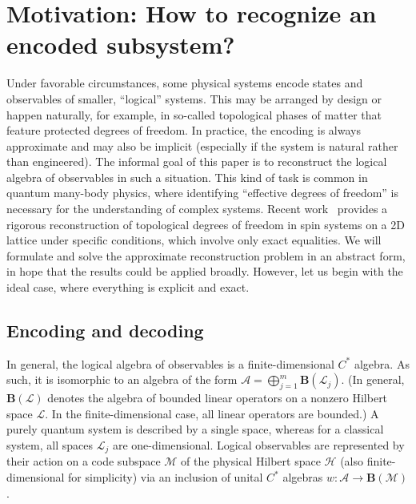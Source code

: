 \documentclass[12pt]{article}
\newcommand{\calA}{\mathcal{A}}
\newcommand{\calH}{\mathcal{H}}
\newcommand{\calL}{\mathcal{L}}
\newcommand{\calM}{\mathcal{M}}
\newcommand{\Bo}{\mathbf{B}}
\newtheorem[definition]{Definition}[Theorem]{Definition}
\newtheorem[remark]{Example}[Theorem]{Example}
\newtheorem[remark]{Remark}[Theorem]{Remark}
\newtheorem[remark]{Question}[Theorem]{Open question}
\newtheorem*[definition]{definition}{Definition}
\newtheorem*[remark]{example}{Example}
\newtheorem*[remark]{remark}{Remark}
\newtheorem*[remark]{question}{Open question}
\numberwithin{equation}{section}
\begin{document}
\section{Motivation: How to recognize an encoded subsystem?}\label{sec_motivation}

Under favorable circumstances, some physical systems encode states and observables of smaller, ``logical'' systems. This may be arranged by design or happen naturally, for example, in so-called topological phases of matter that feature protected degrees of freedom. In practice, the encoding is always approximate and may also be implicit (especially if the system is natural rather than engineered). The informal goal of this paper is to reconstruct the logical algebra of observables in such a situation. This kind of task is common in quantum many-body physics, where identifying ``effective degrees of freedom'' is necessary for the understanding of complex systems. Recent work~\cite{SKK19} provides a rigorous reconstruction of topological degrees of freedom in spin systems on a 2D lattice under specific conditions, which involve only exact equalities. We will formulate and solve the approximate reconstruction problem in an abstract form, in hope that the results could be applied broadly. However, let us begin with the ideal case, where everything is explicit and exact.

\subsection{Encoding and decoding}

In general, the logical algebra of observables is a finite-dimensional $C^*$ algebra. As such, it is isomorphic to an algebra of the form $\calA=\bigoplus_{j=1}^{m}\Bo(\calL_j)$. (In general, $\Bo(\calL)$ denotes the algebra of bounded linear operators on a nonzero Hilbert space $\calL$. In the finite-dimensional case, all linear operators are bounded.) A purely quantum system is described by a single space, whereas for a classical system, all spaces $\calL_j$ are one-dimensional. Logical observables are represented by their action on a code subspace $\calM$ of the physical Hilbert space $\calH$ (also finite-dimensional for simplicity) via an inclusion of unital $C^*$ algebras $w\colon\calA\to\Bo(\calM)$.
\end{document}
